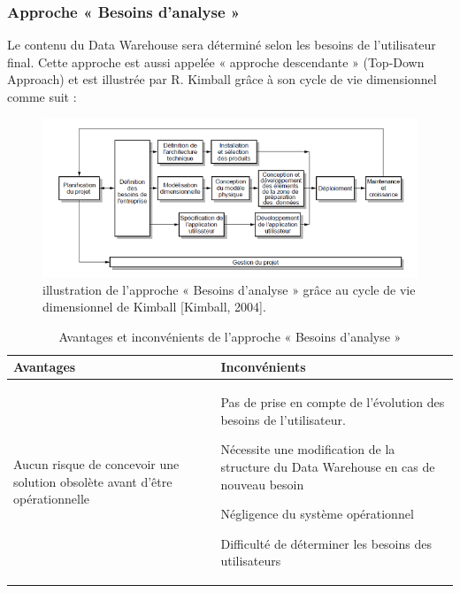  \subsubsection{Approche « Besoins d’analyse »}
 
  Le contenu du Data Warehouse sera déterminé selon les besoins de l’utilisateur final. Cette approche est aussi appelée « approche descendante » (Top-Down Approach) et est illustrée par R. Kimball grâce à son cycle de vie dimensionnel comme suit :
  
  \begin{figure}[h]
	\begin{center}
		\includegraphics[scale=0.85]{images/besion_analyse.png}
		\caption{illustration de l’approche « Besoins d’analyse » grâce au cycle de vie dimensionnel de Kimball [Kimball, 2004].}
		\label{synthese-cout-salarie}
	\end{center}
\end{figure}

\begin{flushleft}
	\begin{longtable}{|p{}|p{}|}
		\caption{Avantages et inconvénients de l'approche « Besoins d’analyse »} 
		\label{Transactionel vs descisionel}
		\\
		
		
		\hline 
		\textbf{Avantages} &
		\textbf{Inconvénients}
		\\
		
		\hline
		\endhead
		\hline
		\endfoot
		\hline
		 
		\begin{description}
		 \item Aucun risque de concevoir une solution obsolète avant d’être opérationnelle
		 \end{description}
		  &
		 
	   \begin{description}
		\item  Pas de prise en compte de l’évolution des besoins de l’utilisateur.
		\item Nécessite une modification de la structure du Data Warehouse en cas de nouveau besoin
		\item Négligence du système opérationnel
		\item Difficulté de déterminer les besoins des utilisateurs
		\end{description}
		\\ 	
		\hline 
	\end{longtable} 
\end{flushleft}


